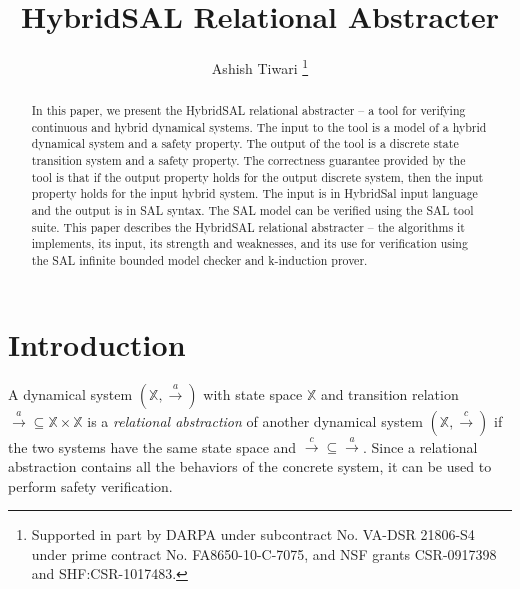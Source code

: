 \documentclass{llncs}
\title{HybridSAL Relational Abstracter}
\author{Ashish Tiwari%
\thanks{Supported in part by DARPA under subcontract No. VA-DSR 21806-S4 
under prime contract No. FA8650-10-C-7075, and
NSF grants CSR-0917398 and SHF:CSR-1017483.}}
\institute{SRI International, Menlo Park, CA.\ \url{ashish.tiwari@sri.com}}
\begin{document}
\maketitle

\begin{abstract}
  In this paper, we present the HybridSAL relational abstracter -- 
  a tool for verifying continuous and hybrid dynamical
  systems.  The input to the tool is a model of a hybrid dynamical
  system and a safety property.  The output of the tool is a discrete
  state transition system and a safety property.  The correctness
  guarantee provided by the tool is that if the output property 
  holds for the output discrete system, then the input property
  holds for the input hybrid system.  The input is in HybridSal
  input language and the output is in SAL syntax. The SAL model
  can be verified using the SAL tool suite.  This paper describes 
  the HybridSAL relational abstracter -- the algorithms it implements, 
  its input, its strength and weaknesses, and its use for verification
  using the SAL infinite bounded model checker and k-induction prover.
\end{abstract}

\def\XX{\mathbb{X}}
\def\QQ{\mathbb{Q}}
\def\YY{\mathbb{Y}}
\def\RR{\mathbb{R}}
\def\ra{\rightarrow}
\def\bra{{\stackrel{a}{\ra}}}  %
\def\rra{{\stackrel{c}{\ra}}}  %

\section{Introduction}

A dynamical system $(\XX, \bra)$  with state space $\XX$ and
transition relation $\bra\subseteq \XX\times \XX$ 
is a {\em{relational abstraction}} of another 
dynamical system $(\XX, \rra)$ if
the two systems have the same state space and
$\rra \subseteq \bra$.
Since a relational abstraction contains all the behaviors of the
concrete system, it can be used to perform safety verification.
\end{document}
